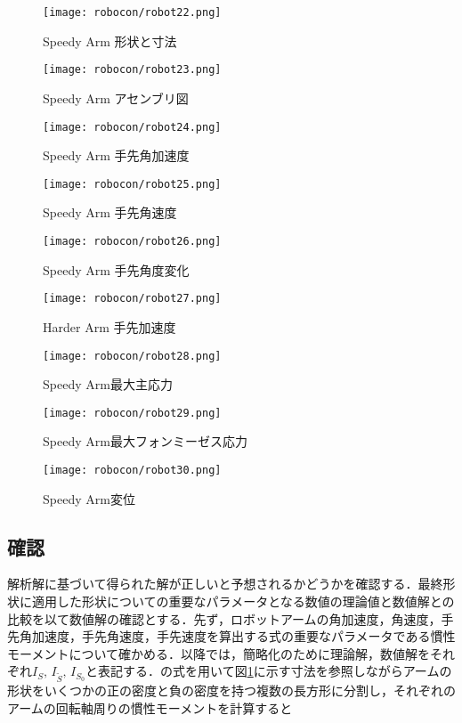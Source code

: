 \documentclass[10pt,b5paper,papersize,dvipdfmx]{jsbook}
\begin{document}
\begin{figure}[htbp]
  \centering
  \texttt{[image: robocon/robot22.png]}
  \caption{Speedy Arm 形状と寸法}
  \label{fig:Speedy Arm 形状と寸法}
\end{figure}
\begin{figure}[htbp]
  \centering
  \texttt{[image: robocon/robot23.png]}
  \caption{Speedy Arm アセンブリ図}
  \label{fig:Speedy Arm アセンブリ図}
\end{figure}
\begin{figure}[htbp]
  \centering
  \texttt{[image: robocon/robot24.png]}
  \caption{Speedy Arm 手先角加速度}
  \label{fig:Speedy Arm 手先角加速度}
\end{figure}
\begin{figure}[htbp]
  \centering
  \texttt{[image: robocon/robot25.png]}
  \caption{Speedy Arm 手先角速度}
  \label{fig:Speedy Arm 手先角速度}
\end{figure}
\begin{figure}[htbp]
  \centering
  \texttt{[image: robocon/robot26.png]}
  \caption{Speedy Arm 手先角度変化}
  \label{fig:Speedy Arm 手先角度変化}
\end{figure}
\begin{figure}[htbp]
  \centering
  \texttt{[image: robocon/robot27.png]}
  \caption{Harder Arm 手先加速度}
  \label{fig:Harder Arm 手先加速度2}
\end{figure}
\begin{figure}[htbp]
  \centering
  \texttt{[image: robocon/robot28.png]}
  \caption{Speedy Arm最大主応力}
  \label{fig:Speedy Arm最大主応力}
\end{figure}
\begin{figure}[htbp]
  \centering
  \texttt{[image: robocon/robot29.png]}
  \caption{Speedy Arm最大フォンミーゼス応力}
  \label{fig:Speedy Arm最大フォンミーゼス応力}
\end{figure}
\begin{figure}[htbp]
  \centering
  \texttt{[image: robocon/robot30.png]}
  \caption{Speedy Arm変位}
  \label{fig:Speedy Arm変位}
\end{figure}
\subsection{確認}
解析解に基づいて得られた解が正しいと予想されるかどうかを確認する．最終形状に適用した形状についての重要なパラメータとなる数値の理論値と数値解との比較を以て数値解の確認とする．先ず，ロボットアームの角加速度，角速度，手先角加速度，手先角速度，手先速度を算出する式の重要なパラメータである慣性モーメントについて確かめる．以降では，簡略化のために理論解，数値解をそれぞれ$I_S,\,I_{\tilde{S}},\,I_{S_0}$と表記する．の式を用いて図\ref{fig:Speedy Arm 形状と寸法}に示す寸法を参照しながらアームの形状をいくつかの正の密度と負の密度を持つ複数の長方形に分割し，それぞれのアームの回転軸周りの慣性モーメントを計算すると
\end{document}
